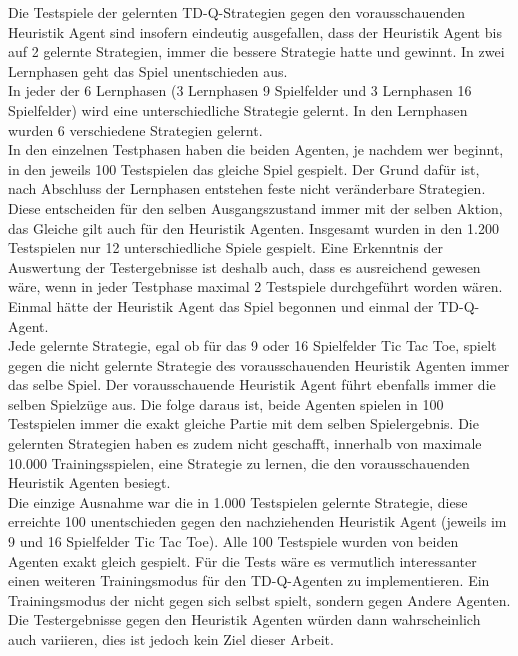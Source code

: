 
Die Testspiele der gelernten TD-Q-Strategien gegen den vorausschauenden Heuristik Agent sind insofern eindeutig ausgefallen, dass der Heuristik Agent bis auf 2 gelernte Strategien, immer die bessere Strategie hatte und gewinnt. In zwei Lernphasen geht das Spiel unentschieden aus. \\

In jeder der 6 Lernphasen (3 Lernphasen 9 Spielfelder und 3 Lernphasen 16 Spielfelder) wird eine unterschiedliche Strategie gelernt. In den Lernphasen wurden 6 verschiedene Strategien gelernt. \\

In den einzelnen Testphasen haben die beiden Agenten, je nachdem wer beginnt, in den jeweils 100 Testspielen das gleiche Spiel gespielt. Der Grund dafür ist, nach Abschluss der Lernphasen entstehen feste nicht veränderbare Strategien. Diese entscheiden für den selben Ausgangszustand immer mit der selben Aktion, das Gleiche gilt auch für den Heuristik Agenten. Insgesamt wurden in den 1.200 Testspielen nur 12 unterschiedliche Spiele gespielt. Eine Erkenntnis der Auswertung der Testergebnisse ist deshalb auch, dass es  ausreichend gewesen wäre, wenn in jeder Testphase maximal 2 Testspiele durchgeführt worden wären. Einmal hätte der Heuristik Agent das Spiel begonnen und einmal der TD-Q-Agent. \\ 



Jede gelernte Strategie, egal ob für das 9 oder 16 Spielfelder Tic Tac Toe, spielt gegen die nicht gelernte Strategie des vorausschauenden Heuristik Agenten immer das selbe Spiel. Der vorausschauende Heuristik Agent führt ebenfalls immer die selben Spielzüge aus. Die folge daraus ist, beide Agenten spielen in 100 Testspielen immer die exakt gleiche Partie mit dem selben Spielergebnis. Die gelernten Strategien haben es zudem nicht geschafft, innerhalb von maximale 10.000 Trainingsspielen, eine Strategie zu lernen, die den vorausschauenden Heuristik Agenten besiegt. \\

Die einzige Ausnahme war die in 1.000 Testspielen gelernte Strategie, diese erreichte 100 unentschieden gegen den nachziehenden Heuristik Agent (jeweils im 9 und 16 Spielfelder Tic Tac Toe). Alle 100 Testspiele wurden von beiden Agenten exakt gleich gespielt. Für die Tests wäre es vermutlich interessanter einen weiteren Trainingsmodus für den TD-Q-Agenten zu implementieren. Ein Trainingsmodus der nicht gegen sich selbst spielt, sondern gegen Andere Agenten. Die Testergebnisse gegen den Heuristik Agenten würden dann wahrscheinlich auch variieren, dies ist jedoch kein Ziel dieser Arbeit. \\

